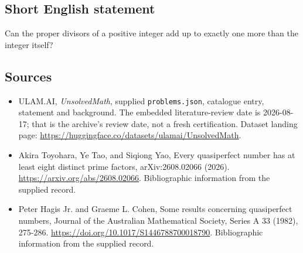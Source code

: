 \documentclass[11pt,a4paper]{article}
\begin{document}
\subsection{Short English statement}

Can the proper divisors of a positive integer add up to exactly one more than the integer itself?

\subsection{Sources}

{\small

\begin{itemize}

\item[\hypertarget{source:statement:1}{S1}] ULAM.AI, \emph{UnsolvedMath}, supplied \texttt{problems.json}, catalogue entry, statement and background. The embedded literature-review date is 2026-08-17; that is the archive’s review date, not a fresh certification. Dataset landing page: \url{https://huggingface.co/datasets/ulamai/UnsolvedMath}.

\item[\hypertarget{source:statement:2}{S2}] Akira Toyohara, Ye Tao, and Siqiong Yao, Every quasiperfect number has at least eight distinct prime factors, arXiv:2608.02066 (2026). \url{https://arxiv.org/abs/2608.02066}. Bibliographic information from the supplied record.

\item[\hypertarget{source:statement:3}{S3}] Peter Hagis Jr. and Graeme L. Cohen, Some results concerning quasiperfect numbers, Journal of the Australian Mathematical Society, Series A 33 (1982), 275-286. \url{https://doi.org/10.1017/S1446788700018790}. Bibliographic information from the supplied record.

\end{itemize}

}

\label{end:statement}
\end{document}
